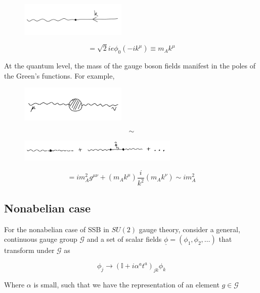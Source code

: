 \begin{figure}[H]\centering\includegraphics[width=2in]{images/ex_vertex.png} \end{figure} 
\begin{equation} = \sqrt{2} i e \phi_0 (-i k^\mu) \equiv m_A k^\mu \end{equation}

\noindent At the quantum level, the mass of the gauge boson fields manifest in the poles of the Green's functions. For example,


\begin{figure}[H]
	\centering
	\includegraphics[width=2in]{images/gauge_boson_poles.png}
\end{figure} 
$$\sim$$
\begin{figure}[H]
	\centering
	\includegraphics[width=3in]{images/gauge_boson_vertices.png}\end{figure} 
 \begin{equation} 
 = i m_A^2 g^{\mu\nu} + (m_A k^\mu) \frac{i}{k^2} (m_A k^\nu) \sim i m_A^2 
 \end{equation}
 
 \subsection*{Nonabelian case}
 
 \noindent For the nonabelian case of SSB in $SU(2)$ gauge theory, consider a general, continuous gauge group $\mathcal{G}$ and a set of scalar fields $\underline{\phi} = (\phi_1, \phi_2, \dots)$ that transform under $\mathcal{G}$ as
 
 \begin{equation}
 \phi_j \rightarrow (\mathbb{I} + i \alpha^a t^a )_{jk} \phi_k
 \end{equation}
 
 \noindent Where $\alpha$ is small, such that we have the representation of an element $g \in \mathcal{G}$
 

